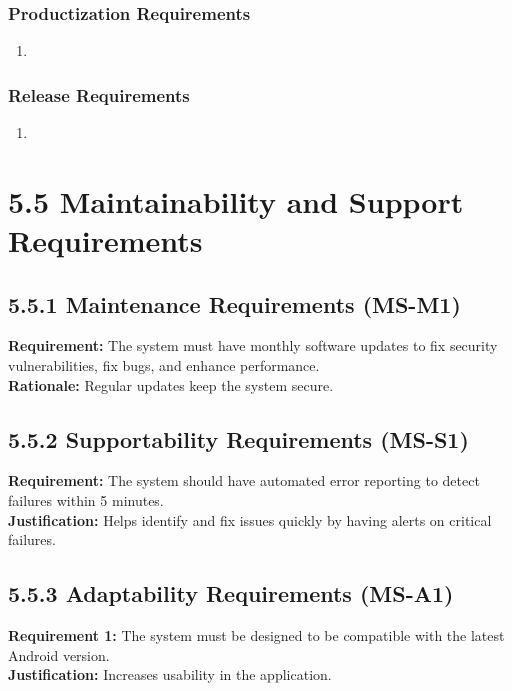 \documentclass[]{article}
\begin{document}
\subsubsection{Productization Requirements}
\label{ssub:productization_requirements}
\begin{enumerate}[{OE-P}1. ]
	\item 
\end{enumerate}

\subsubsection{Release Requirements}
\label{ssub:release_requirements}
\begin{enumerate}[{OE-R}1. ]
	\item 
\end{enumerate}


\section*{5.5 Maintainability and Support Requirements}

\subsection*{5.5.1 Maintenance Requirements (MS-M1)}
\textbf{Requirement:} The system must have monthly software updates to fix security vulnerabilities, fix bugs, and enhance performance.\\
\textbf{Rationale:} Regular updates keep the system secure.

\subsection*{5.5.2 Supportability Requirements (MS-S1)}
\textbf{Requirement:} The system should have automated error reporting to detect failures within 5 minutes.\\
\textbf{Justification:} Helps identify and fix issues quickly by having alerts on critical failures.

\subsection*{5.5.3 Adaptability Requirements (MS-A1)}
\textbf{Requirement 1:} The system must be designed to be compatible with the latest Android version.\\
\textbf{Justification:} Increases usability in the application.
\end{document}
